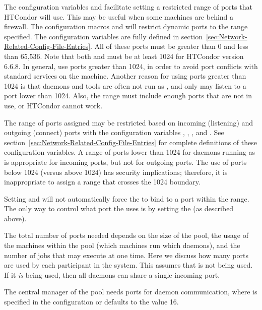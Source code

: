 The configuration variables
 and  facilitate setting a restricted
range of ports that HTCondor will use.
This may be useful when some machines are behind a firewall.
The configuration macros
 and  
will restrict dynamic ports to the range specified.
The configuration variables are fully defined
in section~\ref{sec:Network-Related-Config-File-Entries}.
All of these ports must be greater than 0 and less than 65,536.
Note that both  and  must be at 
least 1024 for HTCondor version 6.6.8.
In general, use ports greater than 1024,
in order
to avoid port conflicts with standard services on the machine.
Another reason for using ports greater than 1024 is that
daemons and tools are often not run as ,
and only  may listen to a port lower than 1024.
Also, the range must include enough ports that are not in use, 
or HTCondor cannot work.

The range of ports assigned may be restricted based on 
incoming (listening) and outgoing (connect) ports
with the configuration variables
,
,
, and
.
See section~\ref{sec:Network-Related-Config-File-Entries}
for complete definitions of these configuration variables.
A range of ports lower than 1024 for daemons
running as  is appropriate for incoming ports,
but not for outgoing ports.
The use of ports below 1024 (versus above 1024)
has security implications; 
therefore, it is inappropriate to assign a range that crosses
the 1024 boundary.


\Note Setting  and  will not
automatically force the  to bind to a port within
the range.
The only way to control what port the  uses is by
setting the  (as described above).

The total number of ports needed depends on the size of the pool,
the usage of the machines within the pool (which machines
run which daemons),
and the number of jobs that may execute at one time.
Here we discuss how many ports are used by each
participant in the system.  This assumes that 
is not being used.  If it \emph{is} being used, then all daemons
can share a single incoming port.

The central manager of the pool needs
ports for daemon communication,
where 
is specified in the
configuration or defaults to the value 16.

